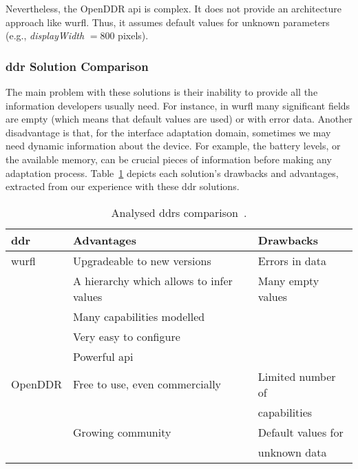 Nevertheless, the OpenDDR \ac{api} is complex. It does not provide an architecture
approach like \ac{wurfl}. Thus, it assumes default values for unknown parameters
(e.g., \textit{displayWidth} $= 800$ pixels).

% 


\subsubsection{\ac{ddr} Solution Comparison}
\label{sec:ddr_comparison}

The main problem with these solutions is their inability to provide all the
information developers usually need. For instance, in \ac{wurfl} many significant 
fields are empty (which means that default values are used) or with error data. 
Another disadvantage is that, for the interface adaptation domain, sometimes we 
may need dynamic information about the device. For example, the battery levels, 
or the available memory, can be crucial pieces of information before making any 
adaptation process. Table~\ref{tbl:ddr_comparison} depicts each solution's drawbacks 
and advantages, extracted from our experience with these \ac{ddr} solutions.


\begin{table}
\caption{Analysed \ac{ddr}s comparison~\citep{ddr_comparison}.}
\label{tbl:ddr_comparison}
\footnotesize
\centering
\begin{tabular}{l l l}
\hline
 \textbf{\ac{ddr}} 	& \textbf{Advantages} 			& \textbf{Drawbacks}  	\\
\hline
  \ac{wurfl} 	& Upgradeable to new versions 			& Errors in data 	\\
		& A hierarchy which allows to infer values 	& Many empty values	\\
		& Many capabilities modelled 			& 			\\
		& Very easy to configure 			& 			\\
		& Powerful \ac{api} 				&			\\
  OpenDDR 	& Free to use, even commercially 		& Limited number of 	\\
		&		 				& capabilities		\\
		& Growing community 				& Default values for 	\\
		& 						& unknown data 		\\
\hline
\end{tabular}
\end{table}

